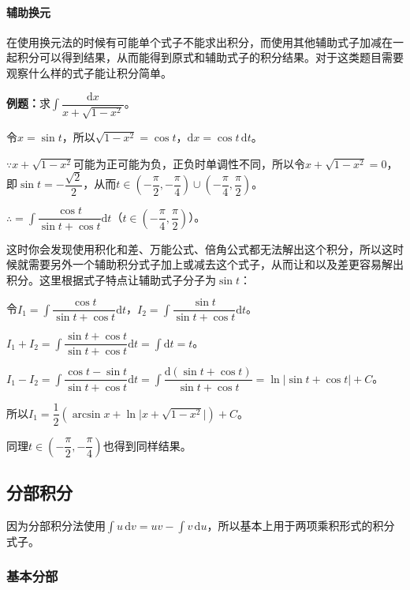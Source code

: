 \documentclass[UTF8, 12pt]{ctexart}
\begin{document}
\paragraph{辅助换元} \leavevmode \medskip

在使用换元法的时候有可能单个式子不能求出积分，而使用其他辅助式子加减在一起积分可以得到结果，从而能得到原式和辅助式子的积分结果。对于这类题目需要观察什么样的式子能让积分简单。

\textbf{例题：}求$\displaystyle{\int\dfrac{\textrm{d}x}{x+\sqrt{1-x^2}}}$。\medskip

令$x=\sin t$，所以$\sqrt{1-x^2}=\cos t$，$\textrm{d}x=\cos t\,\textrm{d}t$。

$\because x+\sqrt{1-x^2}$可能为正可能为负，正负时单调性不同，所以令$ x+\sqrt{1-x^2}=0$，即$\sin t=-\dfrac{\sqrt{2}}{2}$，从而$t\in(-\dfrac{\pi}{2},-\dfrac{\pi}{4})\cup(-\dfrac{\pi}{4},\dfrac{\pi}{2})$。

$\therefore=\displaystyle{\int\dfrac{\cos t}{\sin t+\cos t}\textrm{d}t}$（$t\in(-\dfrac{\pi}{4},\dfrac{\pi}{2})$）。 \medskip

这时你会发现使用积化和差、万能公式、倍角公式都无法解出这个积分，所以这时候就需要另外一个辅助积分式子加上或减去这个式子，从而让和以及差更容易解出积分。这里根据式子特点让辅助式子分子为$\sin t$：

令$I_1=\displaystyle{\int\dfrac{\cos t}{\sin t+\cos t}\textrm{d}t}$，$I_2=\displaystyle{\int\dfrac{\sin t}{\sin t+\cos t}\textrm{d}t}$。

$I_1+I_2=\displaystyle{\int\dfrac{\sin t+\cos t}{\sin t+\cos t}\textrm{d}t=\int\textrm{d}t=t}$。

$I_1-I_2=\displaystyle{\int\dfrac{\cos t-\sin t}{\sin t+\cos t}\textrm{d}t=\int\dfrac{\textrm{d}(\sin t+\cos t)}{\sin t+\cos t}}=\ln\vert\sin t+\cos t\vert +C$。

所以$I_1=\dfrac{1}{2}(\arcsin x+\ln\vert x+\sqrt{1-x^2}\vert)+C$。

同理$t\in(-\dfrac{\pi}{2},-\dfrac{\pi}{4})$也得到同样结果。

\subsection{分部积分}

因为分部积分法使用$\int u\,\textrm{d}v=uv-\int v\,\textrm{d}u$，所以基本上用于两项乘积形式的积分式子。

\subsubsection{基本分部}
\end{document}
